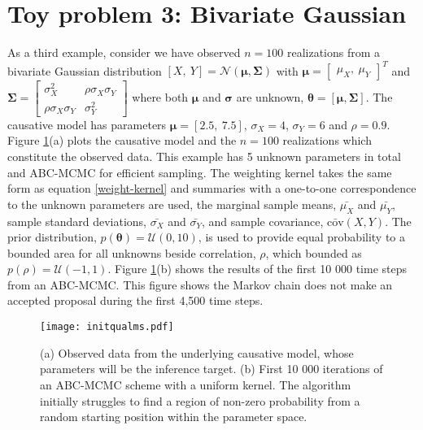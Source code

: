 \section{Toy problem 3: Bivariate Gaussian}
As a third example, consider we have observed $n = 100$ realizations from a bivariate Gaussian distribution $[X,\ Y] = \mathcal{N}(\bm{\mu},\bm{\Sigma})$ with $\bm{\mu} = \begin{bmatrix}
\mu_X,\ \mu_Y
\end{bmatrix}^T$ and $\bm{\Sigma} = \begin{bmatrix}
\sigma^2_X & \rho\sigma_X\sigma_Y\\
\rho\sigma_X\sigma_Y & \sigma^2_Y
\end{bmatrix} $ where both $\bm{\mu}$ and $\bm{\sigma}$ are unknown, $\bm{\theta} = [\bm{\mu},\bm{\Sigma}]$. The causative model has parameters $\bm{\mu} = [2.5,\ 7.5]$, $\sigma_X = 4$, $\sigma_Y = 6$ and $\rho = 0.9$. Figure \ref{init-qualms}(a) plots the causative model and the $n = 100$ realizations which constitute the observed data. This example has 5 unknown parameters in total and ABC-MCMC for efficient sampling. The weighting kernel takes the same form as equation \ref{weight-kernel} and summaries with a one-to-one correspondence to the unknown parameters are used, the marginal sample means, $\bar{\mu_X}$ and $\bar{\mu_Y}$, sample standard deviations, $\bar{\sigma_X}$ and $\bar{\sigma_Y}$, and sample covariance, $\bar{\text{cov}}(X,Y)$. The prior distribution, $p(\bm{\theta}) = \mathcal{U}(0,10)$, is used to provide equal probability to a bounded area for all unknowns beside correlation, $\rho$, which bounded as $p(\rho) = \mathcal{U}(-1,1)$. Figure \ref{init-qualms}(b) shows the results of the first 10 000 time steps from an ABC-MCMC. This figure shows the Markov chain does not make an accepted proposal during the first 4,500 time steps.
\begin{figure}[H]
	\centering
	\texttt{[image: initqualms.pdf]}
	\caption{(a) Observed data from the underlying causative model, whose parameters will be the inference target. (b) First 10 000 iterations of an ABC-MCMC scheme with a uniform kernel. The algorithm initially struggles to find a region of non-zero probability from a random starting position within the parameter space.}
	\label{init-qualms}
\end{figure}


